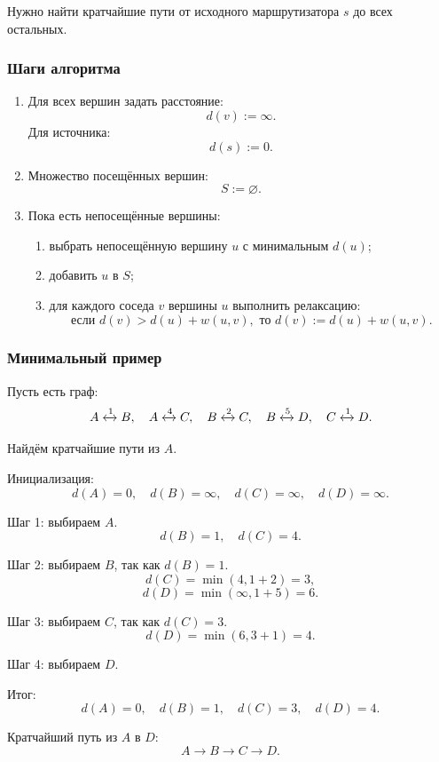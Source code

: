 \documentclass[12pt,a4paper]{article}
\begin{document}
Нужно найти кратчайшие пути от исходного маршрутизатора $s$ до всех остальных.

\subsubsection{Шаги алгоритма}

\begin{enumerate}
    \item Для всех вершин задать расстояние:
    \[
    d(v):=\infty.
    \]
    Для источника:
    \[
    d(s):=0.
    \]

    \item Множество посещённых вершин:
    \[
    S:=\varnothing.
    \]

    \item Пока есть непосещённые вершины:
    \begin{enumerate}
        \item выбрать непосещённую вершину $u$ с минимальным $d(u)$;
        \item добавить $u$ в $S$;
        \item для каждого соседа $v$ вершины $u$ выполнить релаксацию:
        \[
        \text{если } d(v)>d(u)+w(u,v),
        \text{ то } d(v):=d(u)+w(u,v).
        \]
    \end{enumerate}
\end{enumerate}

\subsubsection{Минимальный пример}

Пусть есть граф:
\[
A \xleftrightarrow{1} B,\quad
A \xleftrightarrow{4} C,\quad
B \xleftrightarrow{2} C,\quad
B \xleftrightarrow{5} D,\quad
C \xleftrightarrow{1} D.
\]

Найдём кратчайшие пути из $A$.

Инициализация:
\[
d(A)=0,\quad d(B)=\infty,\quad d(C)=\infty,\quad d(D)=\infty.
\]

Шаг 1: выбираем $A$.
\[
d(B)=1,\quad d(C)=4.
\]

Шаг 2: выбираем $B$, так как $d(B)=1$.
\[
d(C)=\min(4,1+2)=3,
\]
\[
d(D)=\min(\infty,1+5)=6.
\]

Шаг 3: выбираем $C$, так как $d(C)=3$.
\[
d(D)=\min(6,3+1)=4.
\]

Шаг 4: выбираем $D$.

Итог:
\[
d(A)=0,\quad d(B)=1,\quad d(C)=3,\quad d(D)=4.
\]

Кратчайший путь из $A$ в $D$:
\[
A \rightarrow B \rightarrow C \rightarrow D.
\]
\end{document}

